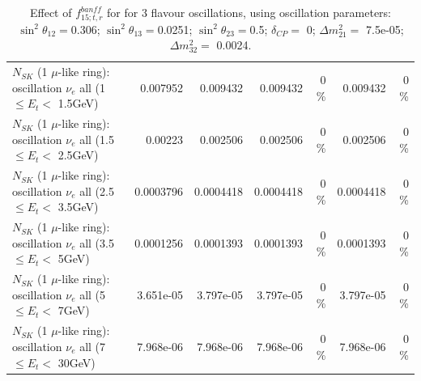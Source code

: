 \begin{table}
\begin{tabular}{| l | r | r | r  r | r  r |}
$N_{SK}$ (1 $\mu$-like ring): oscillation $\nu_{e}$ all (1 $\leq E_{t} <$ 1.5GeV) &        0.007952 &        0.009432 &        0.009432 &        0 \%  &        0.009432 &        0 \%  \\ 
$N_{SK}$ (1 $\mu$-like ring): oscillation $\nu_{e}$ all (1.5 $\leq E_{t} <$ 2.5GeV) &         0.00223 &        0.002506 &        0.002506 &        0 \%  &        0.002506 &        0 \%  \\ 
$N_{SK}$ (1 $\mu$-like ring): oscillation $\nu_{e}$ all (2.5 $\leq E_{t} <$ 3.5GeV) &       0.0003796 &       0.0004418 &       0.0004418 &        0 \%  &       0.0004418 &        0 \%  \\ 
$N_{SK}$ (1 $\mu$-like ring): oscillation $\nu_{e}$ all (3.5 $\leq E_{t} <$ 5GeV) &       0.0001256 &       0.0001393 &       0.0001393 &        0 \%  &       0.0001393 &        0 \%  \\ 
 $N_{SK}$ (1 $\mu$-like ring): oscillation $\nu_{e}$ all (5 $\leq E_{t} <$ 7GeV) &       3.651e-05 &       3.797e-05 &       3.797e-05 &        0 \%  &       3.797e-05 &        0 \%  \\ 
$N_{SK}$ (1 $\mu$-like ring): oscillation $\nu_{e}$ all (7 $\leq E_{t} <$ 30GeV) &       7.968e-06 &       7.968e-06 &       7.968e-06 &        0 \%  &       7.968e-06 &        0 \%  \\ 
\hline
\hline
\end{tabular}
\caption{ Effect of $f_{15; t, r}^{banff}$ for for 3 flavour oscillations, using oscillation parameters:  $\sin^2\theta_{12} = $0.306; $\sin^2\theta_{13} = $0.0251; $\sin^2\theta_{23} = $0.5; $\delta_{CP} = $        0; $\Delta m^2_{21} = $    7.5e-05; $\Delta m^2_{32} = $    0.0024. }
\label{tab:num_banff_15_1RmuT_3f_osc_t13:0.0251}
\end{table}
\clearpage
